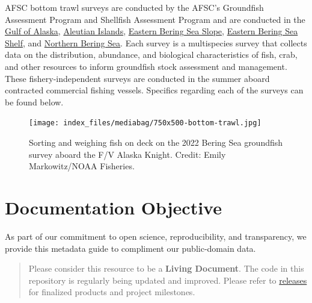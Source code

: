 \documentclass[
  letterpaper,
  oneside,
  open=any]{scrbook}
\begin{document}

AFSC bottom trawl surveys are conducted by the AFSC's Groundfish
Assessment Program and Shellfish Assessment Program and are conducted in
the
\href{https://www.fisheries.noaa.gov/alaska/ecosystems/alaska-fish-research-surveys\#gulf-of-alaska-bottom-trawl-survey}{Gulf
of Alaska},
\href{https://www.fisheries.noaa.gov/alaska/ecosystems/alaska-fish-research-surveys\#aleutian-islands-bottom-trawl-survey}{Aleutian
Islands},
\href{https://www.fisheries.noaa.gov/alaska/ecosystems/alaska-fish-research-surveys\#eastern-bering-sea-upper-continental-slope-bottom-trawl-survey}{Eastern
Bering Sea Slope},
\href{https://www.fisheries.noaa.gov/alaska/ecosystems/alaska-fish-research-surveys\#eastern-bering-sea-shelf-bottom-trawl-survey}{Eastern
Bering Sea Shelf}, and
\href{https://www.fisheries.noaa.gov/alaska/ecosystems/alaska-fish-research-surveys\#northern-bering-sea-shelf-bottom-trawl-survey}{Northern
Bering Sea}. Each survey is a multispecies survey that collects data on
the distribution, abundance, and biological characteristics of fish,
crab, and other resources to inform groundfish stock assessment and
management. These fishery-independent surveys are conducted in the
summer aboard contracted commercial fishing vessels. Specifics regarding
each of the surveys can be found below.

\begin{figure}[H]

{\centering \texttt{[image: index\_files/mediabag/750x500-bottom-trawl.jpg]}

}

\caption{Sorting and weighing fish on deck on the 2022 Bering Sea
groundfish survey aboard the F/V Alaska Knight. Credit: Emily
Markowitz/NOAA Fisheries.}

\end{figure}%

\section*{Documentation Objective}\label{documentation-objective}


As part of our commitment to open science, reproducibility, and
transparency, we provide this metadata guide to compliment our
public-domain data.

\begin{quote}
Please consider this resource to be a \textbf{Living Document}. The code
in this repository is regularly being updated and improved. Please refer
to
\href{https://github.com/afsc-gap-products/gap_products/releases}{releases}
for finalized products and project milestones.
\end{quote}
\end{document}
